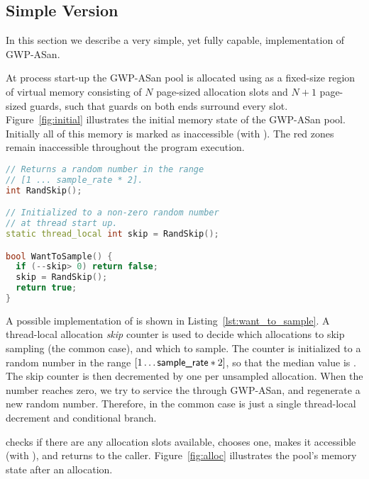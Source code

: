 \subsection{Simple Version}

In this section we describe a very simple, yet fully capable, implementation of
GWP-ASan.

 At process start-up the GWP-ASan pool is allocated
using  as a fixed-size region of virtual memory consisting of
\(N\) page-sized allocation slots and \(N+1\) page-sized guards, such that
guards on both ends surround every slot. Figure~\ref{fig:initial} illustrates
the initial memory state of the GWP-ASan pool. Initially all of this memory is
marked as inaccessible (with ). The red zones remain
inaccessible throughout the program execution.

\begin{lstlisting}[language=C++, frame=single, xleftmargin=0.5em,
  xrightmargin=0.5em, caption=Basic implementation of \inlcode{WantToSample()}., label=lst:want_to_sample]
// Returns a random number in the range
// [1 ... sample_rate * 2].
int RandSkip();

// Initialized to a non-zero random number
// at thread start up.
static thread_local int skip = RandSkip();

bool WantToSample() {
  if (--skip> 0) return false;
  skip = RandSkip();
  return true;
}
\end{lstlisting}

 A possible implementation of
 is shown in Listing~\ref{lst:want_to_sample}. A
thread-local allocation \emph{skip} counter is used to decide which allocations
to skip sampling (the common case), and which to sample. The counter is
initialized to a random number in the range \([1 \ldots \textsf{sample\_rate}
* 2]\), so that the median value is . The skip counter is
then decremented by one per unsampled allocation. When the number reaches zero,
we try to service the  through GWP-ASan, and regenerate a new
random number.  Therefore,  in the common case is just
a single thread-local decrement and conditional branch.

  checks if there are any
allocation slots available, chooses one, makes it accessible (with
), and returns to the caller.
Figure~\ref{fig:alloc} illustrates the pool's memory state after an allocation.

